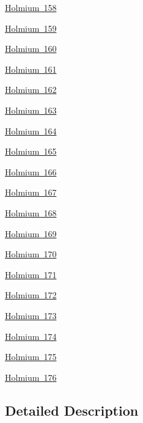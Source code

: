\begin{DoxyCompactItemize}
\item 
\mbox{\hyperlink{group___isotope_const-_holmium-_ho158}{Holmium 158}}
\item 
\mbox{\hyperlink{group___isotope_const-_holmium-_ho159}{Holmium 159}}
\item 
\mbox{\hyperlink{group___isotope_const-_holmium-_ho160}{Holmium 160}}
\item 
\mbox{\hyperlink{group___isotope_const-_holmium-_ho161}{Holmium 161}}
\item 
\mbox{\hyperlink{group___isotope_const-_holmium-_ho162}{Holmium 162}}
\item 
\mbox{\hyperlink{group___isotope_const-_holmium-_ho163}{Holmium 163}}
\item 
\mbox{\hyperlink{group___isotope_const-_holmium-_ho164}{Holmium 164}}
\item 
\mbox{\hyperlink{group___isotope_const-_holmium-_ho165}{Holmium 165}}
\item 
\mbox{\hyperlink{group___isotope_const-_holmium-_ho166}{Holmium 166}}
\item 
\mbox{\hyperlink{group___isotope_const-_holmium-_ho167}{Holmium 167}}
\item 
\mbox{\hyperlink{group___isotope_const-_holmium-_ho168}{Holmium 168}}
\item 
\mbox{\hyperlink{group___isotope_const-_holmium-_ho169}{Holmium 169}}
\item 
\mbox{\hyperlink{group___isotope_const-_holmium-_ho170}{Holmium 170}}
\item 
\mbox{\hyperlink{group___isotope_const-_holmium-_ho171}{Holmium 171}}
\item 
\mbox{\hyperlink{group___isotope_const-_holmium-_ho172}{Holmium 172}}
\item 
\mbox{\hyperlink{group___isotope_const-_holmium-_ho173}{Holmium 173}}
\item 
\mbox{\hyperlink{group___isotope_const-_holmium-_ho174}{Holmium 174}}
\item 
\mbox{\hyperlink{group___isotope_const-_holmium-_ho175}{Holmium 175}}
\item 
\mbox{\hyperlink{group___isotope_const-_holmium-_ho176}{Holmium 176}}
\end{DoxyCompactItemize}


\subsection{Detailed Description}
